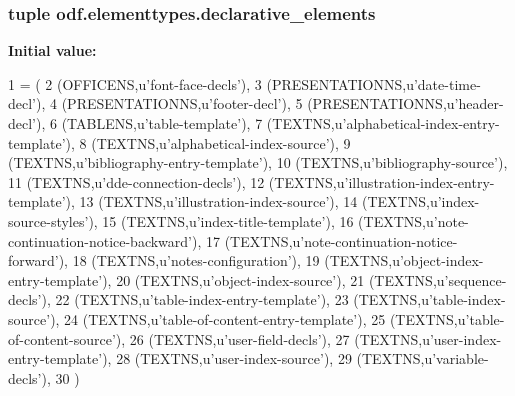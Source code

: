 \hypertarget{namespaceodf_1_1elementtypes_a0f3fdba85272e773adbe3e184125310f}{
\subsubsection[{declarative\+\_\+elements}]{\setlength{\rightskip}{0pt plus 5cm}tuple odf.\+elementtypes.\+declarative\+\_\+elements}}\label{namespaceodf_1_1elementtypes_a0f3fdba85272e773adbe3e184125310f}
{\bfseries Initial value\+:}
\begin{DoxyCode}
1 = (
2     (OFFICENS,\textcolor{stringliteral}{u'font-face-decls'}),
3     (PRESENTATIONNS,\textcolor{stringliteral}{u'date-time-decl'}),
4     (PRESENTATIONNS,\textcolor{stringliteral}{u'footer-decl'}),
5     (PRESENTATIONNS,\textcolor{stringliteral}{u'header-decl'}),
6     (TABLENS,\textcolor{stringliteral}{u'table-template'}),
7     (TEXTNS,\textcolor{stringliteral}{u'alphabetical-index-entry-template'}),
8     (TEXTNS,\textcolor{stringliteral}{u'alphabetical-index-source'}),
9     (TEXTNS,\textcolor{stringliteral}{u'bibliography-entry-template'}),
10     (TEXTNS,\textcolor{stringliteral}{u'bibliography-source'}),
11     (TEXTNS,\textcolor{stringliteral}{u'dde-connection-decls'}),
12     (TEXTNS,\textcolor{stringliteral}{u'illustration-index-entry-template'}),
13     (TEXTNS,\textcolor{stringliteral}{u'illustration-index-source'}),
14     (TEXTNS,\textcolor{stringliteral}{u'index-source-styles'}),
15     (TEXTNS,\textcolor{stringliteral}{u'index-title-template'}),
16     (TEXTNS,\textcolor{stringliteral}{u'note-continuation-notice-backward'}),
17     (TEXTNS,\textcolor{stringliteral}{u'note-continuation-notice-forward'}),
18     (TEXTNS,\textcolor{stringliteral}{u'notes-configuration'}),
19     (TEXTNS,\textcolor{stringliteral}{u'object-index-entry-template'}),
20     (TEXTNS,\textcolor{stringliteral}{u'object-index-source'}),
21     (TEXTNS,\textcolor{stringliteral}{u'sequence-decls'}),
22     (TEXTNS,\textcolor{stringliteral}{u'table-index-entry-template'}),
23     (TEXTNS,\textcolor{stringliteral}{u'table-index-source'}),
24     (TEXTNS,\textcolor{stringliteral}{u'table-of-content-entry-template'}),
25     (TEXTNS,\textcolor{stringliteral}{u'table-of-content-source'}),
26     (TEXTNS,\textcolor{stringliteral}{u'user-field-decls'}),
27     (TEXTNS,\textcolor{stringliteral}{u'user-index-entry-template'}),
28     (TEXTNS,\textcolor{stringliteral}{u'user-index-source'}),
29     (TEXTNS,\textcolor{stringliteral}{u'variable-decls'}),
30 )
\end{DoxyCode}


